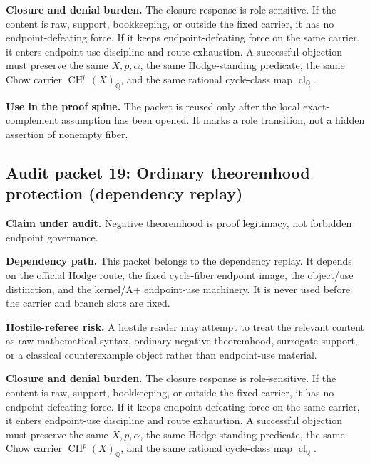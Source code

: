 \documentclass[11pt]{article}
\newcommand{\QQ}{\mathbb{Q}}
\newcommand{\CH}{\operatorname{CH}}
\newcommand{\clQ}{\operatorname{cl}_{\QQ}}
\begin{document}
\par\noindent\textbf{Closure and denial burden.} The closure response is role-sensitive. If the content is raw, support, bookkeeping, or outside the fixed carrier, it has no endpoint-defeating force. If it keeps endpoint-defeating force on the same carrier, it enters endpoint-use discipline and route exhaustion. A successful objection must preserve the same $X,p,\alpha$, the same Hodge-standing predicate, the same Chow carrier $\CH^p(X)_\QQ$, and the same rational cycle-class map $\clQ$.


\par\noindent\textbf{Use in the proof spine.} The packet is reused only after the local exact-complement assumption has been opened. It marks a role transition, not a hidden assertion of nonempty fiber.


\subsection{Audit packet 19: Ordinary theoremhood protection (dependency replay)}


\par\noindent\textbf{Claim under audit.} Negative theoremhood is proof legitimacy, not forbidden endpoint governance.


\par\noindent\textbf{Dependency path.} This packet belongs to the dependency replay. It depends on the official Hodge route, the fixed cycle-fiber endpoint image, the object/use distinction, and the kernel/A+ endpoint-use machinery. It is never used before the carrier and branch slots are fixed.


\par\noindent\textbf{Hostile-referee risk.} A hostile reader may attempt to treat the relevant content as raw mathematical syntax, ordinary negative theoremhood, surrogate support, or a classical counterexample object rather than endpoint-use material.


\par\noindent\textbf{Closure and denial burden.} The closure response is role-sensitive. If the content is raw, support, bookkeeping, or outside the fixed carrier, it has no endpoint-defeating force. If it keeps endpoint-defeating force on the same carrier, it enters endpoint-use discipline and route exhaustion. A successful objection must preserve the same $X,p,\alpha$, the same Hodge-standing predicate, the same Chow carrier $\CH^p(X)_\QQ$, and the same rational cycle-class map $\clQ$.
\end{document}
